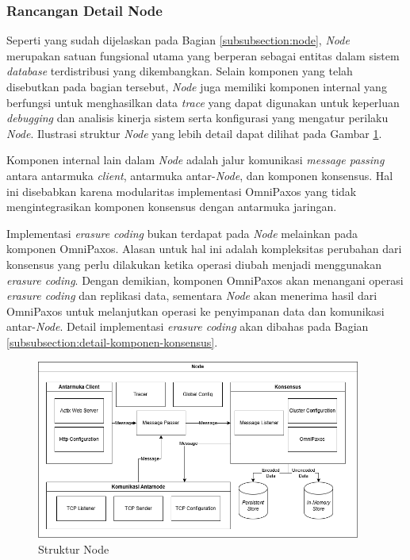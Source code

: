 \subsubsection{Rancangan Detail Node}
\label{subsubsection:detail-node}

Seperti yang sudah dijelaskan pada Bagian \ref{subsubsection:node}, \textit{Node} merupakan satuan fungsional utama yang berperan sebagai entitas dalam sistem \textit{database} terdistribusi yang dikembangkan. Selain komponen yang telah disebutkan pada bagian tersebut, \textit{Node} juga memiliki komponen internal yang berfungsi untuk menghasilkan data \textit{trace} yang dapat digunakan untuk keperluan \textit{debugging} dan analisis kinerja sistem serta konfigurasi yang mengatur perilaku \textit{Node}. Ilustrasi struktur \textit{Node} yang lebih detail dapat dilihat pada Gambar \ref{fig:node-structure}.

Komponen internal lain dalam \textit{Node} adalah jalur komunikasi \textit{message passing} antara antarmuka \textit{client}, antarmuka antar-\textit{Node}, dan komponen konsensus. Hal ini disebabkan karena modularitas implementasi OmniPaxos yang tidak mengintegrasikan komponen konsensus dengan antarmuka jaringan.

Implementasi \textit{erasure coding} bukan terdapat pada \textit{Node} melainkan pada komponen OmniPaxos. Alasan untuk hal ini adalah kompleksitas perubahan dari konsensus yang perlu dilakukan ketika operasi diubah menjadi menggunakan \textit{erasure coding}. Dengan demikian, komponen OmniPaxos akan menangani operasi \textit{erasure coding} dan replikasi data, sementara \textit{Node} akan menerima hasil dari OmniPaxos untuk melanjutkan operasi ke penyimpanan data dan komunikasi antar-\textit{Node}. Detail implementasi \textit{erasure coding} akan dibahas pada Bagian \ref{subsubsection:detail-komponen-konsensus}.

\begin{figure}[ht]
    \centering
    \includegraphics[width=0.95\textwidth]{resources/chapter-3/node-architecture.png}
    \caption{Struktur Node}
    \label{fig:node-structure}
\end{figure}

